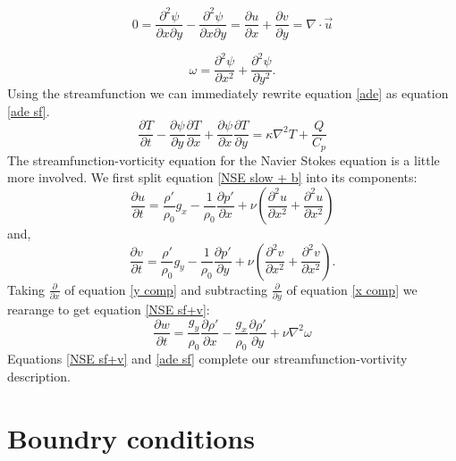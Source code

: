 \documentclass{article}
\begin{document}
\begin{equation}
	0=\frac{\partial^2 \psi}{\partial x \partial y} - \frac{\partial^2 \psi}{\partial x \partial y} = \frac{\partial u}{\partial x} + \frac{\partial v}{\partial y} = \nabla \cdot \vec{u}
	\label{incompsf}
\end{equation}

\begin{equation}
	\omega = \frac{\partial^2 \psi}{\partial x^2} + \frac{\partial^2 \psi}{\partial y^2}.
	\label{vt to st}
\end{equation}
Using the streamfunction we can immediately rewrite equation \ref{ade} as equation \ref{ade sf}.
\begin{equation}
	\frac{\partial T}{\partial t} -\frac{\partial \psi}{\partial y} \frac{\partial T}{\partial x} + \frac{\partial \psi}{\partial x} \frac{\partial T}{\partial y} = \kappa \nabla^2 T + \frac{Q}{C_p}
	\label{ade sf}
\end{equation}
The streamfunction-vorticity equation for the Navier Stokes equation is a little more involved. We first split equation \ref{NSE slow + b} into its components:
\begin{equation}
	\frac{\partial u}{\partial t} = \frac{\rho'}{\rho_0} g_x -\frac{1}{\rho_0} \frac{\partial p'}{\partial x} + \nu (\frac{\partial^2 u}{\partial x^2} + \frac{\partial^2 u}{\partial x^2})
	\label{x comp}
\end{equation}
and,
\begin{equation}
		\frac{\partial v}{\partial t} = \frac{\rho'}{\rho_0} g_y -\frac{1}{\rho_0} \frac{\partial p'}{\partial y} + \nu (\frac{\partial^2 v}{\partial x^2} + \frac{\partial^2 v}{\partial x^2}).
		\label{y comp}
\end{equation}
Taking $\frac{\partial}{\partial x}$ of equation \ref{y comp} and subtracting $\frac{\partial }{\partial y}$ of equation \ref{x comp} we rearange to get equation \ref{NSE sf+v}:
\begin{equation}
	\frac{\partial w}{\partial t} = \frac{g_y}{\rho_0} \frac{\partial \rho'}{\partial x} - \frac{g_x}{\rho_0} \frac{\partial \rho'}{\partial y} + \nu \nabla^2 \omega
	\label{NSE sf+v}
\end{equation}
Equations \ref{NSE sf+v} and \ref{ade sf} complete our streamfunction-vortivity description.

\section*{Boundry conditions}

 
\end{document}
